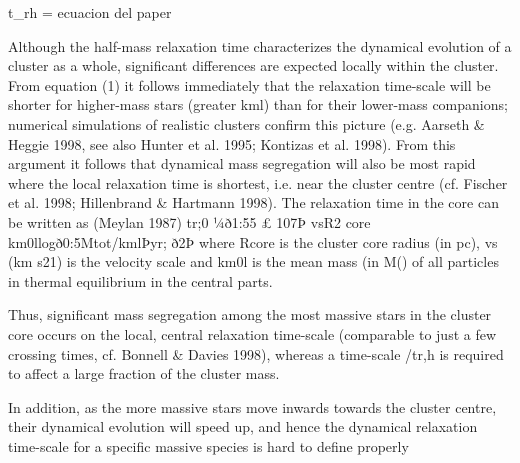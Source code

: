 \documentclass[../Main.tex]{subfiles}
\begin{document}
t_rh = ecuacion del paper

Although the half-mass relaxation time characterizes the
dynamical evolution of a cluster as a whole, significant differences
are expected locally within the cluster. From equation (1) it follows
immediately that the relaxation time-scale will be shorter for
higher-mass stars (greater kml) than for their lower-mass
companions; numerical simulations of realistic clusters confirm
this picture (e.g. Aarseth & Heggie 1998, see also Hunter et al.
1995; Kontizas et al. 1998). From this argument it follows that
dynamical mass segregation will also be most rapid where the local
relaxation time is shortest, i.e. near the cluster centre (cf. Fischer
et al. 1998; Hillenbrand & Hartmann 1998). The relaxation time in
the core can be written as (Meylan 1987)
tr;0 ¼ð1:55 £ 107Þ vsR2
core
km0llogð0:5Mtot/kmlÞyr; ð2Þ
where Rcore is the cluster core radius (in pc), vs (km s21) is the
velocity scale and km0l is the mean mass (in M() of all particles in
thermal equilibrium in the central parts.

Thus, significant mass segregation among the most massive stars
in the cluster core occurs on the local, central relaxation time-scale
(comparable to just a few crossing times, cf. Bonnell & Davies
1998), whereas a time-scale /tr,h is required to affect a large
fraction of the cluster mass.

In addition, as the more massive stars move inwards towards the
cluster centre, their dynamical evolution will speed up, and hence the
dynamical relaxation time-scale for a specific massive species is
hard to define properly
\end{document}
